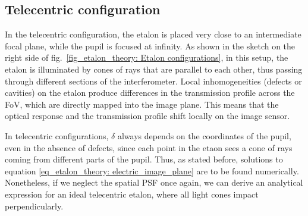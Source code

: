 \subsection{\label{susec_etalon_theory: Tele-perfe}Telecentric configuration}

In the telecentric configuration, the etalon is placed very close to an intermediate focal plane, while the pupil is focused at infinity. As shown in the sketch on the right side of fig.~{\ref{fig_etalon_theory: Etalon configurations}}, in this setup, the etalon is illuminated by cones of rays that are parallel to each other, thus passing through different sections of the interferometer. Local inhomogeneities (defects or cavities) on the etalon produce differences in the transmission profile across the FoV, which are directly mapped into the image plane. This means that the optical response and the transmission profile shift locally on the image sensor. 

In telecentric configurations, $\delta$ always depends on the coordinates of the pupil, even in the absence of defects, since each point in the etaon sees a cone of rays coming from different parts of the pupil. Thus, as stated before, solutions to equation \eqref{eq_etalon_theory: electric_image_plane} are to be found numerically. Nonetheless, if we neglect the spatial PSF once again, we can derive an analytical expression for an ideal telecentric etalon, where all light cones impact perpendicularly.

